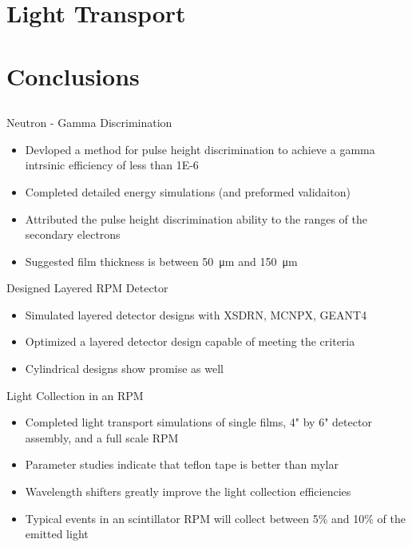 \documentclass[compress]{beamer}
\begin{document}
\section{Light Transport}

\section{Conclusions}
\subsection*{}
\begin{frame}{Neutron - Gamma Discrimination}
  \begin{itemize}
    \item Devloped a method for pulse height discrimination to achieve a gamma intrsinic efficiency of less than \num{1E-6}
    \item Completed detailed energy simulations (and preformed validaiton)
    \item Attributed the pulse height discrimination ability to the ranges of the secondary electrons
    \item Suggested film thickness is between \SI{50}{\um} and \SI{150}{\um}
  \end{itemize}
\end{frame}
\begin{frame}{Designed Layered RPM Detector}
  \begin{itemize}
    \item Simulated layered detector designs with XSDRN, MCNPX, GEANT4
    \item Optimized a layered detector design capable of meeting the criteria
    \item Cylindrical designs show promise as well
  \end{itemize}
\end{frame}
\begin{frame}{Light Collection in an RPM}
  \begin{itemize}
    \item Completed light transport simulations of single films, 4" by 6" detector assembly, and a full scale RPM
    \item Parameter studies indicate that teflon tape is better than mylar
    \item Wavelength shifters greatly improve the light collection efficiencies
    \item Typical events in an scintillator RPM will collect between 5\% and 10\% of the emitted light
  \end{itemize}
\end{frame}
\end{document}
